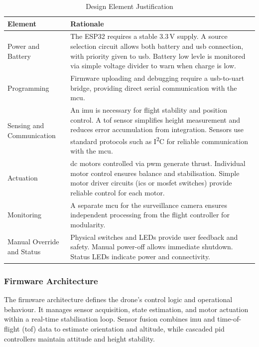 \renewcommand{\arraystretch}{1.2}
\begin{table}[H]
\centering
\caption{Design Element Justification}
\label{tab:hardware-justification}
\begin{tabular}{|p{}|p{}|}
\hline
\rowcolor{gray!15}
\textbf{Element} & \textbf{Rationale} \\
\hline
Power and Battery & The ESP32 requires a stable 3.3\,V supply. A source selection circuit allows both battery and \gls{usb} connection, with priority given to \gls{usb}. Battery low levle is monitored via simple voltage divider to warn when charge is low. \\
\hline
Programming & Firmware uploading and debugging require a \gls{usb}-to-\gls{uart} bridge, providing direct serial communication with the \gls{mcu}. \\
\hline
Sensing and Communication & An \gls{imu} is necessary for flight stability and position control. A \gls{tof} sensor simplifies height measurement and reduces error accumulation from integration. Sensors use standard protocols such as I\textsuperscript{2}C for reliable communication with the \gls{mcu}. \\
\hline
Actuation & \gls{dc} motors controlled via \gls{pwm} generate thrust. Individual motor control ensures balance and stabilisation. Simple motor driver circuits (\glspl{ic} or \gls{mosfet} switches) provide reliable control for each motor. \\
\hline
Monitoring & A separate \gls{mcu} for the surveillance camera ensures independent processing from the flight controller for modularity. \\
\hline
Manual Override and Status & Physical switches and LEDs provide user feedback and safety. Manual power-off allows immediate shutdown. Status LEDs indicate power and connectivity. \\
\hline
\end{tabular}
\end{table}

\subsubsection{Firmware Architecture}
The firmware architecture defines the drone’s control logic and operational behaviour. It manages sensor acquisition, state estimation, and motor actuation within a real-time stabilisation loop. Sensor fusion combines \gls{imu} and time-of-flight (\gls{tof}) data to estimate orientation and altitude, while cascaded \gls{pid} controllers maintain attitude and height stability.  

